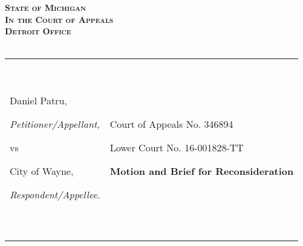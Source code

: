 \documentclass[12pt,\documentclassflag]{michiganCourtOfAppealsBrief}
\begin{document}
\begin{centering}
\bf\scshape State of Michigan\\In the Court of Appeals\\Detroit Office\\~\\ 
\rm 

\makeandtab
\setlength{\tabcolsep}{20pt}%
\begin{tabular}{p{} p{}}
\cline{1-2}
  {~

  \raggedright Daniel Patru,\par
  \hfill\textit{Petitioner/Appellant,}
  \vspace{.5\baselineskip}\par
  vs\par
  \vspace{.5\baselineskip}
  \raggedright City of Wayne,\par
  \hfill\textit{Respondent/Appellee.}
  
  ~} &  {~
       \par\par
       \hfill Court of Appeals No. 346894\par
       \hfill Lower Court No. 16-001828-TT\par\vspace{\baselineskip}

       \hfill \raggedleft\textbf{Motion and Brief for Reconsideration}\vspace{.5\baselineskip}\par
  ~}
  \\ \cline{1-2}\vspace{2mm}
  
       

\end{tabular}
\end{centering}
\end{document}

